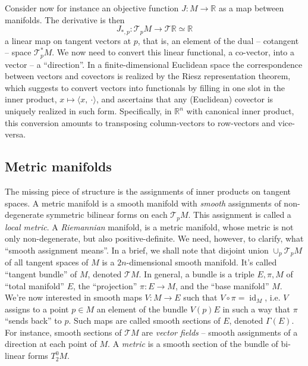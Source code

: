 Consider now for instance an objective function \( J: M \to \mathbb{R} \) as a
map between manifolds. The derivative is then \[ J_{*,p} : \mathcal{T}_pM \to
\mathcal{T}\mathbb{R}\simeq\mathbb{R} \] a linear map on tangent vectors at \(
p \), that is, an element of the dual -- cotangent -- space \( \mathcal{T}_p^*M
\). We now need to convert this linear functional, a co-vector, into a vector
-- a ``direction''. In a finite-dimensional Euclidean space the correspondence
between vectors and covectors is realized by the Riesz representation theorem,
which suggests to convert vectors into functionals by filling in one slot
in the inner product, \( x\mapsto \langle x,~\cdot\rangle \), and ascertains
that any (Euclidean) covector is uniquely realized in such form. Specifically,
in \( \mathbb{R}^n \) with canonical inner product, this conversion amounts
to transposing column-vectors to row-vectors and vice-versa.

\subsection*{Metric manifolds}

The missing piece of structure is the assignments of inner products on tangent
spaces. A metric manifold is a smooth manifold with \emph{smooth} assignments
of non-degenerate symmetric bilinear forms on each \( \mathcal{T}_pM \).  This
assignment is called a \emph{local metric}.  A \emph{Riemannian} manifold, is a
metric manifold, whose metric is not only non-degenerate, but also
positive-definite.
We need, however, to clarify, what ``smooth assignment means''.  In a brief, we
shall note that disjoint union \( \cup_p\mathcal{T}_pM \) of all tangent spaces
of \( M \) is a \( 2n \)-dimensional smooth manifold. It's called ``tangent
bundle'' of \( M \), denoted \( \mathcal{T}M \). In general, a bundle is a
triple \( E, \pi, M \) of ``total manifold'' \( E \), the ``projection'' \(
\pi: E\to M \), and the ``base manifold'' \( M \). We're now interested in
smooth maps \( V: M \to E \) such that \( V\circ\pi = \operatorname{id}_M \),
i.e. \( V \) assigns to a point \( p\in M \) an element of the bundle \( V(p) E
\) in such a way that \( \pi \) ``sends back'' to \( p \). Such maps are called
smooth sections of \( E \), denoted \( \Gamma(E) \). For instance,
smooth sections of \( \mathcal{T}M \) are \emph{vector fields} -- smooth assignments
of a direction at each point of \( M \). A \emph{metric} is a smooth section
of the bundle of bi-linear forms \( T^0_2M \).


